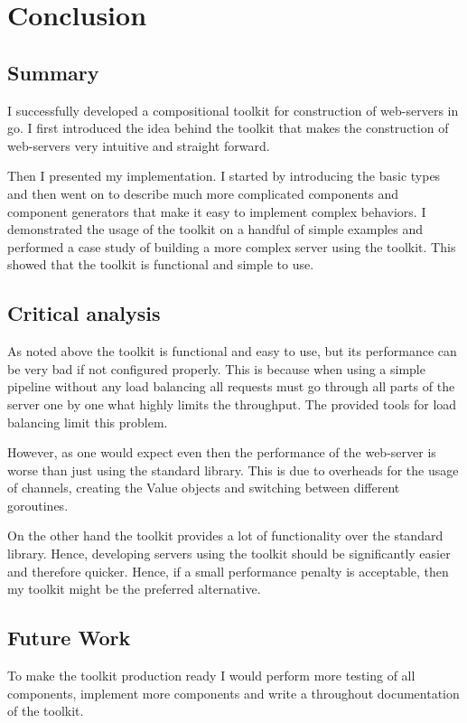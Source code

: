 \section{Conclusion}
\label{sec:conclusion}
\subsection{Summary}
I successfully developed a compositional toolkit for construction of 
web-servers in go. I first introduced the idea behind the toolkit that 
makes the construction of web-servers very intuitive and straight forward. 

Then I presented my implementation. I started by introducing the basic types
and then went on to describe much more complicated components and component generators
that make it easy to implement complex behaviors. I demonstrated the usage of the 
toolkit on a handful of simple examples and performed a case study of building
a more complex server using the toolkit. This showed that the toolkit is
functional and simple to use. 


\subsection{Critical analysis}
As noted above the toolkit is functional and easy to use, but its performance
can be very bad if not configured properly. This is because when using a simple
pipeline without any load balancing all requests must go through all parts
of the server one by one what highly limits the throughput. The provided
tools for load balancing limit this problem.

However, as one would expect even then the performance of the web-server
is worse than just using the standard library. This is due to overheads
for the usage of channels, creating the Value objects
and switching between different goroutines.

On the other hand the toolkit provides a lot of functionality over the
standard library. Hence, developing servers using the toolkit should be
significantly easier and therefore quicker. Hence, if a small performance
penalty is acceptable, then my toolkit might be the preferred alternative.

\subsection{Future Work}
To make the toolkit production ready I would perform more testing of all
components, implement more components and write a throughout documentation
of the toolkit. 

